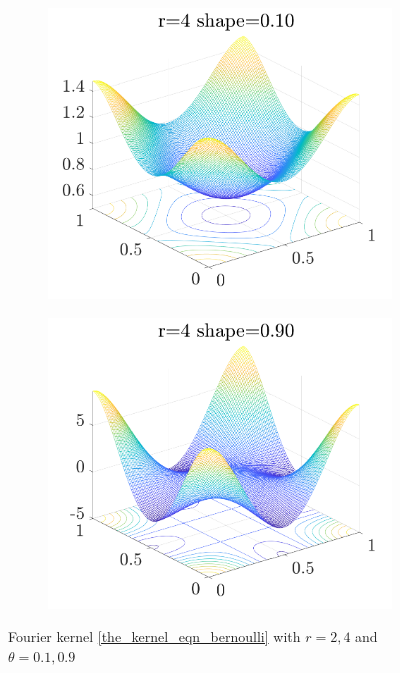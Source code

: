 \documentclass[twocolumn]{svjour3}          %
\begin{document}
\begin{figure}
\begin{subfigure}{0.40\textwidth}
		\includegraphics[width=\textwidth]{"fourier_kernel r_4 shape_10by100"}
	\end{subfigure}
	\centering
	\begin{subfigure}{0.40\textwidth}
		\includegraphics[width=\textwidth]{"fourier_kernel r_4 shape_90by100"}
	\end{subfigure}
\caption{Fourier kernel \eqref{the_kernel_eqn_bernoulli} with $r=2,4$ and $\theta = 0.1, 0.9$}
\label{fig:Fourier_kernel}
\end{figure}
\end{document}
